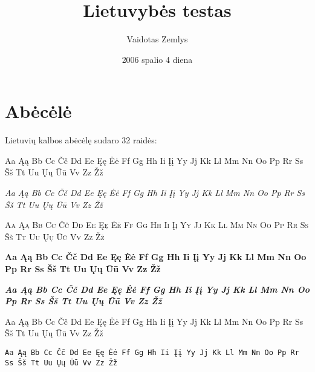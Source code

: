 \documentclass[a4paper]{article}
\title{Lietuvybės testas}
\date{2006 spalio 4 diena}
\author{Vaidotas Zemlys}
\begin{document}
\maketitle
\tableofcontents
\section{Abėcėlė}

Lietuvių kalbos abėcėlę sudaro 32 raidės:

Aa Ąą Bb Cc Čč Dd Ee Ęę Ėė Ff Gg Hh Ii Įį Yy Jj Kk Ll Mm Nn Oo Pp Rr Ss Šš Tt Uu Ųų Ūū Vv Zz Žž

\textit{Aa Ąą Bb Cc Čč Dd Ee Ęę Ėė Ff Gg Hh Ii Įį Yy Jj Kk Ll Mm Nn Oo Pp Rr Ss Šš Tt Uu Ųų Ūū Vv Zz Žž}

\textsc{Aa Ąą Bb Cc Čč Dd Ee Ęę Ėė Ff Gg Hh Ii Įį Yy Jj Kk Ll Mm Nn Oo Pp Rr Ss Šš Tt Uu Ųų Ūū Vv Zz Žž}

{\selectfont{Aa Ąą Bb Cc Čč Dd Ee Ęę Ėė Ff Gg Hh Ii Įį Yy Jj Kk Ll Mm Nn Oo Pp Rr Ss Šš Tt Uu Ųų Ūū Vv Zz Žž}}

\textbf{Aa Ąą Bb Cc Čč Dd Ee Ęę Ėė Ff Gg Hh Ii Įį Yy Jj Kk Ll Mm Nn Oo Pp Rr Ss Šš Tt Uu Ųų Ūū Vv Zz Žž}

\textbf{\textit{Aa Ąą Bb Cc Čč Dd Ee Ęę Ėė Ff Gg Hh Ii Įį Yy Jj Kk Ll Mm Nn Oo Pp Rr Ss Šš Tt Uu Ųų Ūū Vv Zz Žž}}

\textsf{Aa Ąą Bb Cc Čč Dd Ee Ęę Ėė Ff Gg Hh Ii Įį Yy Jj Kk Ll Mm Nn Oo Pp Rr Ss Šš Tt Uu Ųų Ūū Vv Zz Žž}

\texttt{Aa Ąą Bb Cc Čč Dd Ee Ęę Ėė Ff Gg Hh Ii Įį Yy Jj Kk Ll Mm Nn Oo Pp Rr Ss Šš Tt Uu Ųų Ūū Vv Zz Žž}

\end{document}
